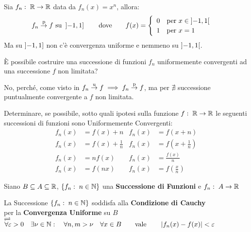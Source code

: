 \begin{example}
	\label{ex:conv_punt_nimplies_conv_unif}
	Sia $f_n:\; \mathbb{R} \to \mathbb{R}$ data da $f_n(x) = x^n$, allora:
	\[
		f_n \overset{\text{p}}{\to} f \text{ su } \left]-1,1\right]
		\qquad \text{dove} \qquad
		f(x) = \begin{cases}
			\begin{array}{ll}
				0 & \text{per } x \in \left]-1,1\right[\\
				1 & \text{per } x = 1
			\end{array}
		\end{cases}
	\]
	Ma su $\left]-1,1\right]$ non c'è convergenza uniforme e nemmeno su $\left]-1,1\right[$.
\end{example}
\begin{exercise}
	È possibile costruire una successione di funzioni $f_n$ uniformemente convergenti ad una successione $f$ non limitata?
	\begin{solution}
		No, perché, come visto in  $f_n \overset{\text{u}}{\to} f \implies f_n \overset{\text{p}}{\to} f$, ma per  $\nexists$ successione puntualmente convergente a $f$ non limitata.
	\end{solution}
\end{exercise}
\begin{exercise}
	Determinare, se possibile, sotto quali ipotesi sulla funzione $f:\; \mathbb{R} \to \mathbb{R}$ le seguenti successioni di funzioni sono Uniformemente Convergenti:
	\begin{align*}
		f_n(x) &= f(x) + n & f_n(x) &= f(x + n)\\
		f_n(x) &= f(x) + \frac{1}{n} & f_n(x) &= f(x + \frac{1}{n})\\
		f_n(x) &= nf(x) & f_n(x) &= \frac{f(x)}{n}\\
		f_n(x) &= f(nx) & f_n(x) &= f(\frac{x}{n})
	\end{align*}
\end{exercise}
\begin{definition}
	\label{def:succ_funz_cau}
	Siano $B \subseteq A \subseteq \mathbb{R}$, $\left\{f_n:\; n \in \mathbb{N}\right\}$ una \textbf{Successione di Funzioni} e $f_n:\; A \to \mathbb{R}$
	\begin{center}
		La Successione $\left\{f_n:\; n \in \mathbb{N}\right\}$ soddisfa alla \textbf{Condizione di Cauchy}\\
		per la \textbf{Convergenza Uniforme} su $B$\\
		$\rightleftharpoons$\\
		$
			\forall \varepsilon > 0 \quad \exists \nu \in \N: \quad \forall n, m > \nu \quad \forall x \in B %
			\qquad \text{vale} \qquad \abs{f_n(x) - f(x)} < \varepsilon
		$
	\end{center}
\end{definition}

